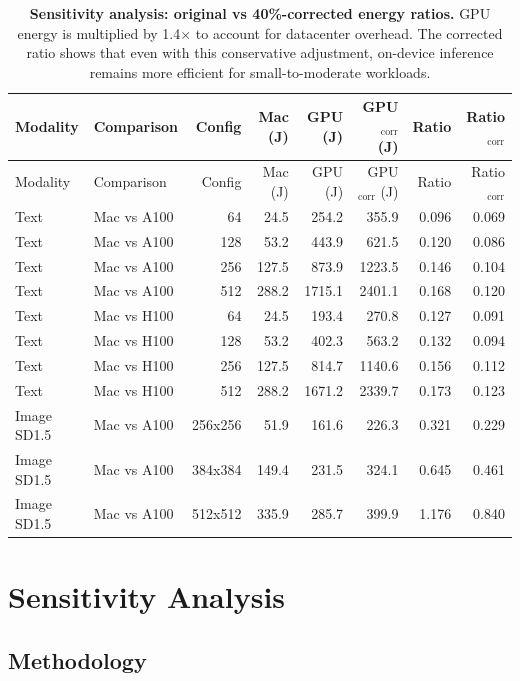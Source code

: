 \documentclass[11pt]{article}
\begin{document}
\begin{longtable}{llrrrrrr}
\caption{\textbf{Sensitivity analysis: original vs 40\%-corrected energy ratios.} GPU energy is multiplied by 1.4$\times$ to account for datacenter overhead. The corrected ratio shows that even with this conservative adjustment, on-device inference remains more efficient for small-to-moderate workloads.} \\
\toprule
Modality & Comparison & Config & Mac (J) & GPU (J) & GPU$_{\text{corr}}$ (J) & Ratio & Ratio$_{\text{corr}}$ \\
\midrule
\endfirsthead
\toprule
Modality & Comparison & Config & Mac (J) & GPU (J) & GPU$_{\text{corr}}$ (J) & Ratio & Ratio$_{\text{corr}}$ \\
\midrule
\endhead
Text & Mac vs A100 & 64 & 24.5 & 254.2 & 355.9 & 0.096 & 0.069 \\
Text & Mac vs A100 & 128 & 53.2 & 443.9 & 621.5 & 0.120 & 0.086 \\
Text & Mac vs A100 & 256 & 127.5 & 873.9 & 1223.5 & 0.146 & 0.104 \\
Text & Mac vs A100 & 512 & 288.2 & 1715.1 & 2401.1 & 0.168 & 0.120 \\
Text & Mac vs H100 & 64 & 24.5 & 193.4 & 270.8 & 0.127 & 0.091 \\
Text & Mac vs H100 & 128 & 53.2 & 402.3 & 563.2 & 0.132 & 0.094 \\
Text & Mac vs H100 & 256 & 127.5 & 814.7 & 1140.6 & 0.156 & 0.112 \\
Text & Mac vs H100 & 512 & 288.2 & 1671.2 & 2339.7 & 0.173 & 0.123 \\
Image SD1.5 & Mac vs A100 & 256x256 & 51.9 & 161.6 & 226.3 & 0.321 & 0.229 \\
Image SD1.5 & Mac vs A100 & 384x384 & 149.4 & 231.5 & 324.1 & 0.645 & 0.461 \\
Image SD1.5 & Mac vs A100 & 512x512 & 335.9 & 285.7 & 399.9 & 1.176 & 0.840 \\

\bottomrule
\end{longtable}

\clearpage

\section{Sensitivity Analysis}

\subsection{Methodology}
\end{document}
